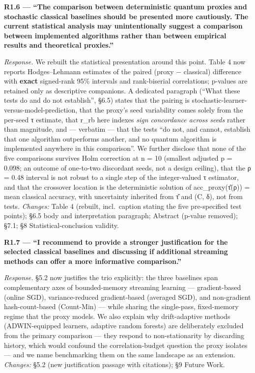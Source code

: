 \documentclass[
  11pt,
]{article}
\begin{document}
\textbf{R1.6 --- ``The comparison between deterministic quantum proxies
and stochastic classical baselines should be presented more cautiously.
The current statistical analysis may unintentionally suggest a
comparison between implemented algorithms rather than between empirical
results and theoretical proxies.''}

\emph{Response.} We rebuilt the statistical presentation around this
point. Table 4 now reports Hodges--Lehmann estimates of the paired
(proxy − classical) difference with \textbf{exact} signed-rank 95\%
intervals and rank-biserial correlations; p-values are retained only as
descriptive companions. A dedicated paragraph (``What these tests do and
do not establish'', §6.5) states that the pairing is
stochastic-learner-versus-model-prediction, that the proxy's seed
variability comes solely from the per-seed τ estimate, that r\_rb here
indexes \emph{sign concordance across seeds} rather than magnitude, and
--- verbatim --- that the tests ``do not, and cannot, establish that one
algorithm outperforms another, and no quantum algorithm is implemented
anywhere in this comparison''. We further disclose that none of the five
comparisons survives Holm correction at n = 10 (smallest adjusted p =
0.098; an outcome of one-to-two discordant seeds, not a design ceiling),
that the ρ = 0.48 interval is not robust to a single step of the
integer-valued τ estimator, and that the crossover location is the
deterministic solution of acc\_proxy(τ̂(ρ)) = mean classical accuracy,
with uncertainty inherited from τ̂ and (C, δ), not from tests.
\emph{Changes:} Table 4 (rebuilt, incl.~caption stating the five
pre-specified test points); §6.5 body and interpretation paragraph;
Abstract (p-value removed); §7.1; §8 Statistical-conclusion validity.

\textbf{R1.7 --- ``I recommend to provide a stronger justification for
the selected classical baselines and discussing if additional streaming
methods can offer a more informative comparison.''}

\emph{Response.} §5.2 now justifies the trio explicitly: the three
baselines span complementary axes of bounded-memory streaming learning
--- gradient-based (online SGD), variance-reduced gradient-based
(averaged SGD), and non-gradient hash-count-based (Count-Min) --- while
sharing the single-pass, fixed-memory regime that the proxy models. We
also explain why drift-adaptive methods (ADWIN-equipped learners,
adaptive random forests) are deliberately excluded from the primary
comparison --- they respond to non-stationarity by discarding history,
which would confound the correlation-budget question the proxy isolates
--- and we name benchmarking them on the same landscape as an extension.
\emph{Changes:} §5.2 (new justification passage with citations); §9
Future Work.
\end{document}
